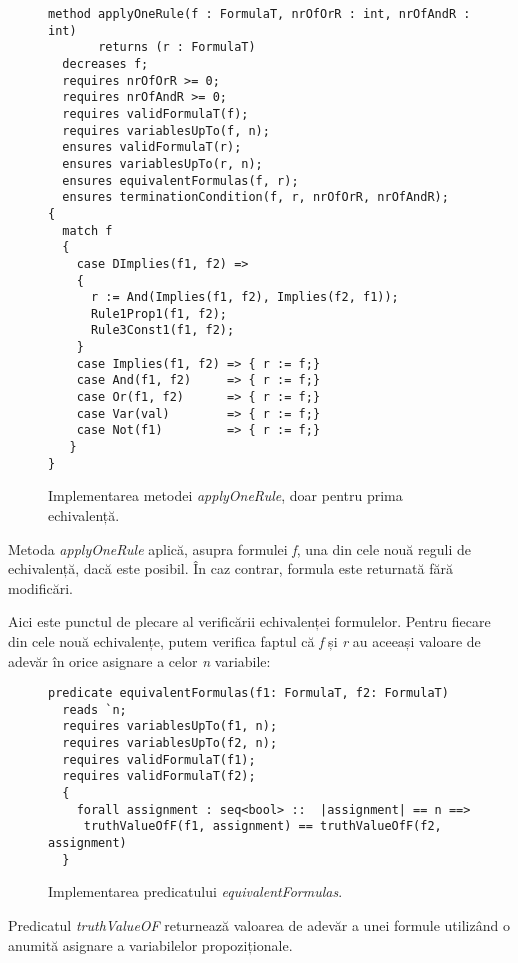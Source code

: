 \begin{figure}[H]
    \caption{Implementarea metodei \textit{applyOneRule}, doar pentru prima echivalență.}
    
\begin{Verbatim}[fontsize=\small, frame=single,baselinestretch=0.1]
method applyOneRule(f : FormulaT, nrOfOrR : int, nrOfAndR : int) 
       returns (r : FormulaT)
  decreases f;
  requires nrOfOrR >= 0;
  requires nrOfAndR >= 0;
  requires validFormulaT(f);
  requires variablesUpTo(f, n);
  ensures validFormulaT(r);
  ensures variablesUpTo(r, n);
  ensures equivalentFormulas(f, r);
  ensures terminationCondition(f, r, nrOfOrR, nrOfAndR);
{
  match f
  {
    case DImplies(f1, f2) => 
    { 
      r := And(Implies(f1, f2), Implies(f2, f1));
      Rule1Prop1(f1, f2);
      Rule3Const1(f1, f2);
    }
    case Implies(f1, f2) => { r := f;}
    case And(f1, f2)     => { r := f;}
    case Or(f1, f2)      => { r := f;}
    case Var(val)        => { r := f;}
    case Not(f1)         => { r := f;}
   }
}
\end{Verbatim}
\end{figure}

Metoda \textit{applyOneRule} aplică, asupra formulei \textit{f}, una din cele nouă reguli de echivalență, dacă este posibil. În caz contrar, formula este returnată fără modificări.

Aici este punctul de plecare al verificării echivalenței formulelor. Pentru fiecare din cele nouă echivalențe, putem verifica faptul că \textit{f} și \textit{r} au aceeași valoare de adevăr în orice asignare a celor \textit{n} variabile:

\begin{figure}[H]
    \caption{Implementarea predicatului \textit{equivalentFormulas}.}
\begin{Verbatim}[fontsize=\small, frame=single,baselinestretch=0.1]
predicate equivalentFormulas(f1: FormulaT, f2: FormulaT)
  reads `n;
  requires variablesUpTo(f1, n);
  requires variablesUpTo(f2, n);
  requires validFormulaT(f1);
  requires validFormulaT(f2);
  {
    forall assignment : seq<bool> ::  |assignment| == n ==> 
     truthValueOfF(f1, assignment) == truthValueOfF(f2, assignment)
  }
\end{Verbatim}
\end{figure}

\begin{remark}
Predicatul \textit{truthValueOF} returnează valoarea de adevăr a unei formule utilizând o anumită asignare a variabilelor propoziționale.
\end{remark}


